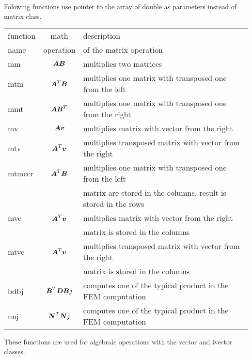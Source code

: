 Folowing functions use pointer to the array of {\sf double} as parameters instead of {\sf matrix} class.


\begin{center}
\begin{tabular}{|l|c|l|}
\hline
function & math & description \\
name     & operation & of the matrix operation
\\ \hline \hline
{\sf mm} & ${\mbox{\boldmath$A$} \mbox{\boldmath$B$}}$ & multiplies two matrices
\\ \hline
{\sf mtm} & ${\mbox{\boldmath$A$}^T \mbox{\boldmath$B$}}$ & multiplies one matrix with transposed one from the left
\\ \hline
{\sf mmt} & ${\mbox{\boldmath$A$} \mbox{\boldmath$B$}^T}$ & multiplies one matrix with transposed one from the right
\\ \hline
{\sf mv} & ${\mbox{\boldmath$A$} \mbox{\boldmath$v$}}$ & multiplies matrix with vector from the right
\\ \hline
{\sf mtv} & ${\mbox{\boldmath$A$}^T \mbox{\boldmath$v$}}$ & multiplies transposed matrix with vector from the right
\\ \hline
{\sf mtmccr} & ${\mbox{\boldmath$A$}^T \mbox{\boldmath$B$}}$ & multiplies one matrix with transposed one from the left\\
 & & matrix are stored in the columns, result is stored in the rows
\\ \hline
{\sf mvc} & ${\mbox{\boldmath$A$}^T \mbox{\boldmath$v$}}$ & multiplies  matrix with vector from the right\\
& & matrix is stored in the columns
\\ \hline
{\sf mtvc} & ${\mbox{\boldmath$A$}^T \mbox{\boldmath$v$}}$ & multiplies transposed matrix with vector from the right\\
& & matrix is stored in the columns
\\ \hline
{\sf bdbj} & $\mbox{\boldmath$B$}^T \mbox{\boldmath$D B$}j$ & computes one of the typical product in the FEM computation
\\ \hline
{\sf nnj} & $\mbox{\boldmath$N$}^T \mbox{\boldmath$N$} j$ & computes one of the typical product in the FEM computation
\\ \hline
\end{tabular}
\end{center}


These functions are used for algebraic operations with the {\sf vector} and {\sf ivector} classes.

